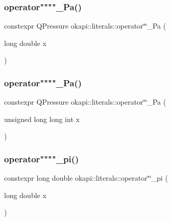 \mbox{\label{namespaceokapi_1_1literals_ab89337b3aebf1978915cf59c47690c2b}} 
\subsubsection{\texorpdfstring{operator""""\_Pa()}{operator""\_Pa()}\hspace{0.1cm}{\footnotesize\ttfamily [1/2]}}
{\footnotesize\ttfamily constexpr Q\+Pressure okapi\+::literals\+::operator\char`\"{}\char`\"{}\+\_\+\+Pa (\begin{DoxyParamCaption}\item[{long double}]{x }\end{DoxyParamCaption})}

\mbox{\label{namespaceokapi_1_1literals_a7e08cc5723b3fa603130a1c7a48adca5}} 
\subsubsection{\texorpdfstring{operator""""\_Pa()}{operator""\_Pa()}\hspace{0.1cm}{\footnotesize\ttfamily [2/2]}}
{\footnotesize\ttfamily constexpr Q\+Pressure okapi\+::literals\+::operator\char`\"{}\char`\"{}\+\_\+\+Pa (\begin{DoxyParamCaption}\item[{unsigned long long int}]{x }\end{DoxyParamCaption})}

\mbox{\label{namespaceokapi_1_1literals_a40698358b7eaa4c223ff8b0076249f4e}} 
\subsubsection{\texorpdfstring{operator""""\_pi()}{operator""\_pi()}\hspace{0.1cm}{\footnotesize\ttfamily [1/2]}}
{\footnotesize\ttfamily constexpr long double okapi\+::literals\+::operator\char`\"{}\char`\"{}\+\_\+pi (\begin{DoxyParamCaption}\item[{long double}]{x }\end{DoxyParamCaption})}

